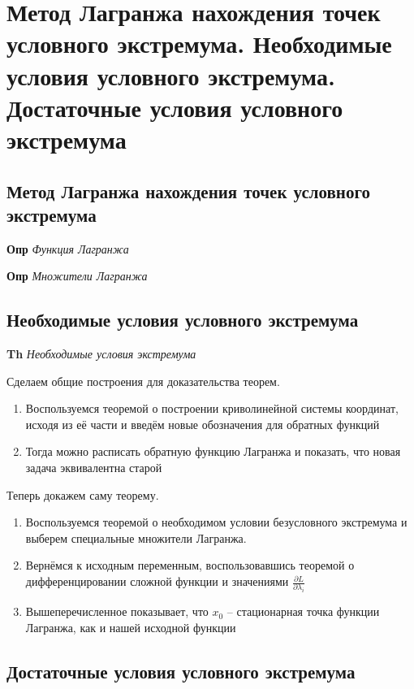 \documentclass[a4paper, 14pt]{article}
\begin{document}
    \section{Метод Лагранжа нахождения точек условного экстремума.
    Необходимые условия условного экстремума.
    Достаточные условия условного экстремума}
    
    \subsection{Метод Лагранжа нахождения точек условного экстремума}
    
    \textbf{Опр} \textit{Функция Лагранжа}
    
    \textbf{Опр} \textit{Множители Лагранжа}
    
    \subsection{Необходимые условия условного экстремума}
    
    \textbf{Th} \textit{Необходимые условия экстремума}
    
    Сделаем общие построения для доказательства теорем.
    
    \begin{enumerate}
        \item Воспользуемся теоремой о построении криволинейной системы координат, исходя из её части и введём новые
        обозначения для обратных функций
        \item Тогда можно расписать обратную функцию Лагранжа и показать, что новая задача эквивалентна старой
    \end{enumerate}
    
    Теперь докажем саму теорему.
    
    \begin{enumerate}
        \item Воспользуемся теоремой о необходимом условии безусловного экстремума и выберем специальные множители
        Лагранжа.
        \item Вернёмся к исходным переменным, воспользовавшись теоремой о дифференцировании сложной функции и значениями
        $\frac{\partial L}{\partial \lambda_i}$
        \item Вышеперечисленное показывает, что $x_0$ -- стационарная точка функции Лагранжа, как и нашей исходной функции
    \end{enumerate}
    
    \subsection{Достаточные условия условного экстремума}
    
\end{document}
